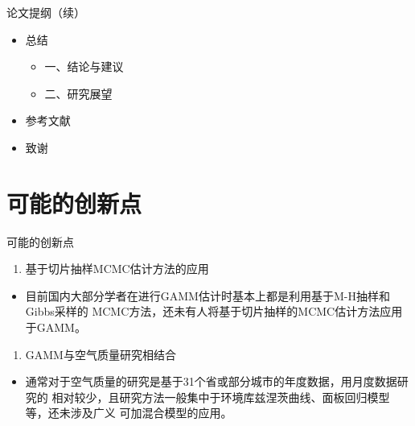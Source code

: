 \documentclass[ignorenonframetext,11pt,xcolor=dvipsnames,aspectratio=1610,hyperref={bookmarksdepth=4}]{beamer}
\providecommand{\tightlist}{%
  \setlength{\itemsep}{0pt}\setlength{\parskip}{0pt}}
\begin{document}
\begin{frame}{论文提纲（续）}

\begin{itemize}
\item
  总结

  \begin{itemize}
  \tightlist
  \item
    一、结论与建议
  \item
    二、研究展望
  \end{itemize}
\item
  参考文献
\item
  致谢
\end{itemize}

\end{frame}

\section{可能的创新点}

\begin{frame}{可能的创新点}

\begin{enumerate}
\def\labelenumi{\arabic{enumi}.}
\tightlist
\item
  基于切片抽样MCMC估计方法的应用
\end{enumerate}

\begin{itemize}
\tightlist
\item
  目前国内大部分学者在进行GAMM估计时基本上都是利用基于M-H抽样和Gibbs采样的
  MCMC方法，还未有人将基于切片抽样的MCMC估计方法应用于GAMM。
\end{itemize}

\begin{enumerate}
\def\labelenumi{\arabic{enumi}.}
\setcounter{enumi}{1}
\tightlist
\item
  GAMM与空气质量研究相结合
\end{enumerate}

\begin{itemize}
\tightlist
\item
  通常对于空气质量的研究是基于31个省或部分城市的年度数据，用月度数据研究的
  相对较少，且研究方法一般集中于环境库兹涅茨曲线、面板回归模型等，还未涉及广义
  可加混合模型的应用。
\end{itemize}

\end{frame}
\end{document}
